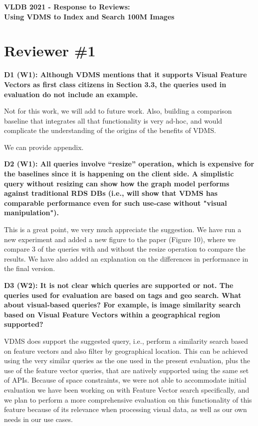 \documentclass[11pt]{proposalnsf}
\begin{document}
\begin{center}
{\Large{\bf VLDB 2021 - Response to Reviews: \\
Using VDMS to Index and Search 100M Images}}

\end{center}

\section{Reviewer \#1}

\textbf{
D1 (W1): Although VDMS mentions that it supports Visual Feature Vectors as
first class citizens in Section 3.3, the queries used in evaluation
do not include an example.
}\bigskip


Not for this work, we will add to future work.
Also, building a comparison baseline that integrates all that functionality
is very ad-hoc, and would complicate the understanding of the origins
of the benefits of VDMS.

We can provide appendix.

\bigskip
\textbf{
D2 (W1): All queries involve “resize” operation, which is expensive for the
baselines since it is happening on the client side.
A simplistic query without resizing can show how the graph model performs
against traditional RDS DBs (i.e., will show that VDMS has comparable
performance even for such use-case without "visual manipulation").
}\bigskip

This is a great point, we very much appreciate the suggestion.
We have run a new experiment and added a new figure to the paper (Figure 10),
where we compare 3 of the queries with and without the resize operation
to compare the results.
We have also added an explanation on the differences in performance
in the final version.

\bigskip
\textbf{
D3 (W2): It is not clear which queries are supported or not.
The queries used for evaluation are based on tags and geo search.
What about visual-based queries? For example, is image similarity search based
on Visual Feature Vectors within a geographical region supported?
}\bigskip

VDMS does support the suggested query, i.e., perform a similarity search based
on feature vectors and also filter by geographical location.
This can be achieved using the very similar queries as the one used in
the present evaluation, plus the use of the feature vector queries,
that are natively supported using the same set of APIs.
Because of space constraints, we were not able to accommodate initial evaluation
we have been working on with Feature Vector search specifically,
and we plan to perform a more comprehensive evaluation on this functionality
of this feature because of its relevance when processing visual data, as well
as our own needs in our use cases.
\end{document}
